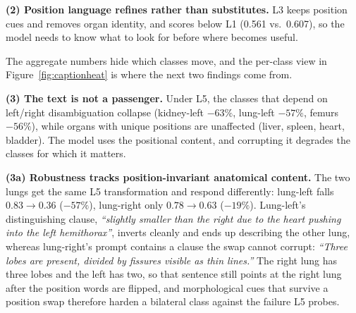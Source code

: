 \documentclass[10pt]{article}
\begin{document}
\textbf{(2) Position language refines rather than substitutes.} L3 keeps position
cues and removes organ identity, and scores below L1 (0.561 vs.\ 0.607), so the
model needs to know what to look for before where becomes useful.

The aggregate numbers hide which classes move, and the per-class view in
Figure~\ref{fig:captionheat} is where the next two findings come from.

\textbf{(3) The text is not a passenger.} Under L5, the classes that depend on
left/right disambiguation collapse (kidney-left $-63\%$, lung-left $-57\%$, femurs
$-56\%$), while organs with unique positions are unaffected (liver, spleen, heart,
bladder). The model uses the positional content, and corrupting it degrades the
classes for which it matters.

\textbf{(3a) Robustness tracks position-invariant anatomical content.} The two
lungs get the same L5 transformation and respond differently: lung-left falls
$0.83\to0.36$ ($-57\%$), lung-right only $0.78\to0.63$ ($-19\%$). Lung-left's
distinguishing clause, \emph{``slightly smaller than the right due to the heart
pushing into the left hemithorax''}, inverts cleanly and ends up describing the
other lung, whereas lung-right's prompt contains a clause the swap cannot corrupt:
\emph{``Three lobes are present, divided by fissures visible as thin lines.''} The
right lung has three lobes and the left has two, so that sentence still points at
the right lung after the position words are flipped, and morphological cues that
survive a position swap therefore harden a bilateral class against the failure L5
probes.
\end{document}
